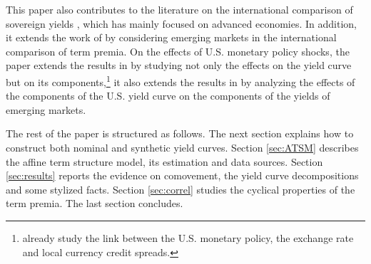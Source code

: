 {%


This paper also contributes to the literature on the international comparison of sovereign yields \citep{DahlquistHasseltoft:2016,ACDM:2019}, which has mainly focused on advanced economies. 
In addition, it extends the work of \cite{Wright:2011} by considering emerging markets in the international comparison of term premia.
On the effects of U.S. monetary policy shocks, the paper extends the results in \citet*{GilchristYueZakrajsek:2019} by studying not only the effects on the yield curve but on its components,\footnote{ \cite{HofmannShimShin:2017} already study the link between the U.S. monetary policy, the exchange rate and local currency credit spreads.} it also extends the results in \cite*{CurcuruKaminLiRodriguez:2018} by analyzing the effects of the components of the U.S. yield curve on the components of the yields of emerging markets. 


The rest of the paper is structured as follows. The next section explains how to construct both nominal and synthetic yield curves. Section \ref{sec:ATSM} describes the affine term structure model, its estimation and data sources. Section \ref{sec:results} reports the evidence on comovement, the yield curve decompositions and some stylized facts. Section \ref{sec:correl} studies the cyclical properties of the term premia. The last section concludes.

}{}	%


